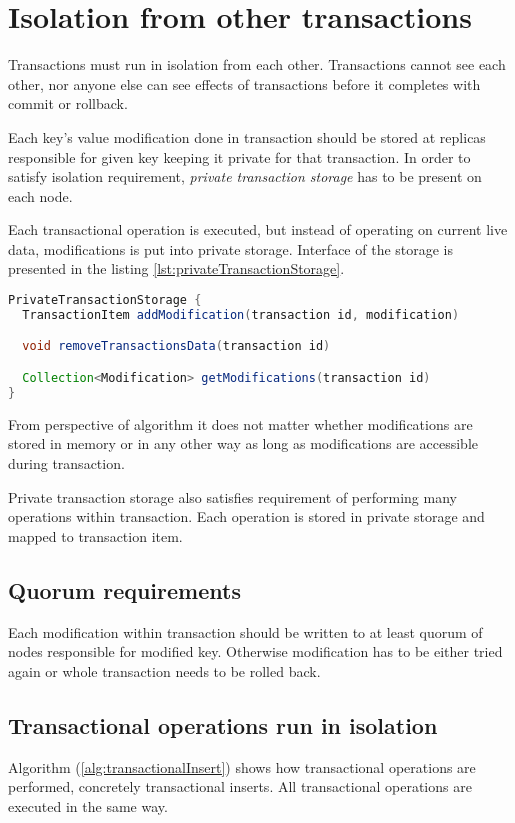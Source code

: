
\section{Isolation from other transactions}
Transactions must run in isolation from each other. Transactions cannot see each other, nor anyone else can see effects of transactions before it completes with commit or rollback.

Each key's value modification done in transaction should be stored at replicas responsible for given key keeping it private for that transaction. In order to satisfy isolation requirement, \emph{private transaction storage} has to be present on each node.

Each transactional operation is executed, but instead of operating on current live data, modifications is put into private storage. Interface of the storage is presented in the listing \ref{lst:privateTransactionStorage}.

\begin{lstlisting}[language=Java,style=outcode,label={lst:privateTransactionStorage},caption={API of private transaction storage}]
PrivateTransactionStorage {
  TransactionItem addModification(transaction id, modification)

  void removeTransactionsData(transaction id)

  Collection<Modification> getModifications(transaction id)        
}

\end{lstlisting}


From perspective of algorithm it does not matter whether modifications are stored in memory or in any other way as long as modifications are accessible during transaction.

Private transaction storage also satisfies requirement of performing many operations within transaction. Each operation is stored in private storage and mapped to transaction item.


\subsection{Quorum requirements}
Each modification within transaction should be written to at least quorum of nodes responsible for modified key. Otherwise modification has to be either tried again or whole transaction needs to be rolled back. 

\subsection{Transactional operations run in isolation}
Algorithm (\ref{alg:transactionalInsert}) shows how transactional operations are performed, concretely transactional inserts. All transactional operations are executed in the same way. 

